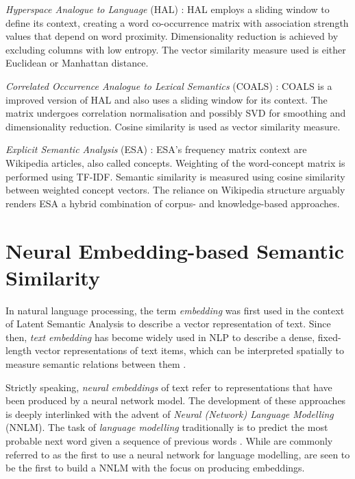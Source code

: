 \documentclass[11pt]{scrreprt}
\let\citef\cite  %
\let\cite\parencite  %
\begin{document}
\textit{Hyperspace Analogue to Language} (HAL) \cite{lundProducingHighdimensionalSemantic1996}: HAL employs a sliding window to define its context, creating a word co-occurrence matrix with association strength values that depend on word proximity. Dimensionality reduction is achieved by excluding columns with low entropy. The vector similarity measure used is either Euclidean or Manhattan distance.

\textit{Correlated Occurrence Analogue to Lexical Semantics} (COALS) \cite{rohde2006improved}: COALS is a improved version of HAL and also uses a sliding window for its context. The matrix undergoes correlation normalisation and possibly SVD for smoothing and dimensionality reduction. Cosine similarity is used as vector similarity measure.

\textit{Explicit Semantic Analysis} (ESA) \cite{gabrilovich2007computing}: ESA's frequency matrix context are Wikipedia articles, also called concepts. Weighting of the word-concept matrix is performed using TF-IDF. Semantic similarity is measured using cosine similarity between weighted concept vectors. The reliance on Wikipedia structure arguably renders ESA a hybrid combination of corpus- and knowledge-based approaches.


\section{Neural Embedding-based Semantic Similarity}
\label{sec:neural-embedding-semantic-similarity}
In natural language processing, the term \textit{embedding} was first used in the context of Latent Semantic Analysis \cite{deerwesterIndexingLatentSemantic1990} to describe a vector representation of text. Since then, \textit{text embedding} has become widely used in NLP to describe a dense, fixed-length vector representations of text items, which can be interpreted spatially to measure semantic relations between them \cite{almeidaWordEmbeddingsSurvey2023}.

Strictly speaking, \textit{neural embeddings} of text refer to representations that have been produced by a neural network model. The development of these approaches is deeply interlinked with the advent of \textit{Neural (Network) Language Modelling} (NNLM). The task of \textit{language modelling} traditionally is to predict the most probable next word given a sequence of previous words \cite{chenEmpiricalStudySmoothing1999}. While \citef{bengioNeuralProbabilisticLanguage2000} are commonly referred to as the first to use a neural network for language modelling, \citef{collobertUnifiedArchitectureNatural2008} are seen to be the first to build a NNLM with the focus on producing embeddings. 
\end{document}
